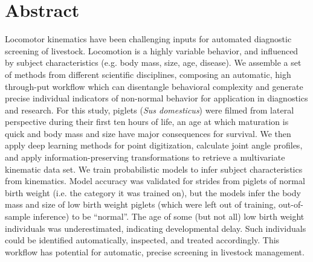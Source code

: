 \section{Abstract}
\label{abstract}
Locomotor kinematics have been challenging inputs for automated diagnostic screening of livestock.
Locomotion is a highly variable behavior, and influenced by subject characteristics (e.g. body mass, size, age, disease).
We assemble a set of methods from different scientific disciplines, composing an automatic, high through-put workflow which can disentangle behavioral complexity and generate precise individual indicators of non-normal behavior for application in diagnostics and research.
For this study, piglets (\emph{Sus domesticus}) were filmed from lateral perspective during their first ten hours of life, an age at which maturation is quick and body mass and size have major consequences for survival.
We then apply deep learning methods for point digitization, calculate joint angle profiles, and apply information-preserving transformations to retrieve a multivariate kinematic data set.
We train probabilistic models to infer subject characteristics from kinematics.
Model accuracy was validated for strides from piglets of normal birth weight (i.e. the category it was trained on), but the models infer the body mass and size of low birth weight piglets (which were left out of training, out-of-sample inference) to be ``normal''.
The age of some (but not all) low birth weight individuals was underestimated, indicating developmental delay.
Such individuals could be identified automatically, inspected, and treated accordingly.
This workflow has potential for automatic, precise screening in livestock management.


\FloatBarrier
\clearpage
